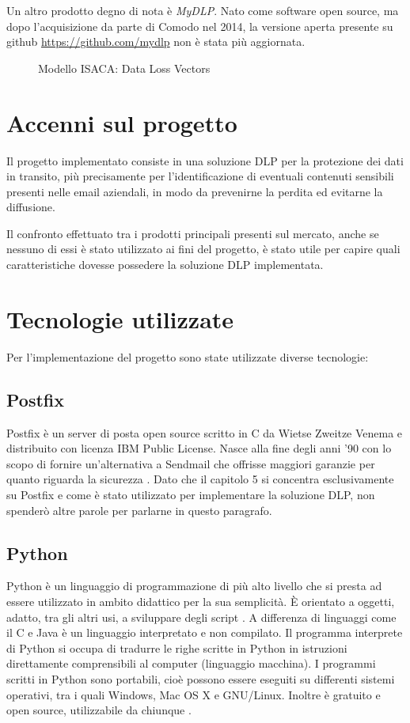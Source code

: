     Un altro prodotto degno di nota è \textit{MyDLP}. Nato come software open source,
    ma dopo l'acquisizione da parte di Comodo nel 2014, la versione aperta presente su github
    \url{https://github.com/mydlp} non è stata più aggiornata.

    \begin{figure}
        \centering
        \caption{Modello ISACA: Data Loss Vectors}\label{ModelloIsaca}
      \end{figure}

\section{Accenni sul progetto}
Il progetto implementato consiste in una soluzione DLP per la protezione dei dati in transito, più precisamente per
l'identificazione di eventuali contenuti sensibili presenti nelle email aziendali, in modo da prevenirne la perdita
ed evitarne la diffusione.

Il confronto effettuato tra i prodotti principali presenti sul mercato, anche se nessuno di essi è stato utilizzato 
ai fini del progetto, è stato utile per capire quali caratteristiche dovesse possedere la soluzione DLP implementata.

\section{Tecnologie utilizzate}
Per l'implementazione del progetto sono state utilizzate diverse tecnologie:
    \subsection{Postfix}
    Postfix è un server di posta open source scritto in C da Wietse Zweitze Venema e distribuito con licenza IBM 
    Public License. Nasce alla fine degli anni '90 con lo scopo di fornire un'alternativa a Sendmail che offrisse 
    maggiori garanzie per quanto riguarda la sicurezza \cite{Postfix1}.
    Dato che il capitolo 5 si concentra esclusivamente su Postfix e come è stato utilizzato per implementare la 
    soluzione DLP, non spenderò altre parole per parlarne in questo paragrafo.
    
    \subsection{Python}
    Python è un linguaggio di programmazione di più alto livello che si presta ad essere utilizzato in ambito didattico per la sua semplicità. È orientato a oggetti, adatto, tra gli altri usi, a sviluppare 
    degli script \cite{Python1}. A differenza di linguaggi come il C e Java è un linguaggio interpretato e non compilato. 
    Il programma interprete di Python si occupa di tradurre le righe scritte in Python in istruzioni direttamente 
    comprensibili al computer (linguaggio macchina). I programmi scritti in Python sono portabili, 
    cioè possono essere eseguiti su differenti sistemi operativi, tra i quali Windows, Mac OS X e GNU/Linux. 
    Inoltre è gratuito e open source, utilizzabile da chiunque \cite{boscaini2017imparare}.


